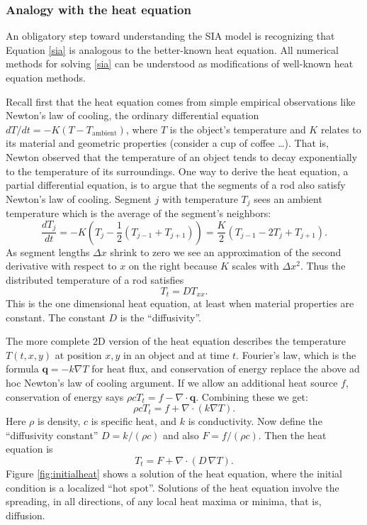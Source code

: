 \documentclass[titlepage,letterpaper,final,12pt]{scrartcl}
\newcommand{\grad}{\nabla}
\newcommand{\Div}{\nabla\cdot}
\begin{document}
\subsubsection*{Analogy with the heat equation}  An obligatory step toward understanding the SIA model is recognizing that Equation \eqref{sia} is analogous to the better-known heat equation.  All numerical methods for solving \eqref{sia} can be understood as modifications of well-known heat equation methods.

Recall first that the heat equation comes from simple empirical observations like Newton's law of cooling, the ordinary differential equation $dT/dt = -K (T-T_{\text{ambient}})$, 
where $T$ is the object's temperature and $K$ relates to its material and geometric properties (consider a cup of coffee \dots).  That is, Newton observed that the temperature of an object tends to decay exponentially to the temperature of its surroundings.  One way to derive the heat equation, a partial differential equation, is to argue that the segments of a rod also satisfy Newton's law of cooling.  Segment $j$ with temperature $T_j$ sees an ambient temperature which is the average of the segment's neighbors:
   $$\frac{dT_j}{dt} = -K \left(T_j - \frac{1}{2} (T_{j-1} + T_{j+1}) \right) = \frac{K}{2} \left(T_{j-1} - 2 T_j + T_{j+1}\right).$$
As segment lengths $\Delta x$ shrink to zero we see an approximation of the second derivative with respect to $x$ on the right because $K$ scales with $\Delta x^2$.  Thus the distributed temperature of a rod satisfies
\begin{equation}
  T_t = D T_{xx}. \label{heat1D}
\end{equation}
This is the one dimensional heat equation, at least when material properties are constant.  The constant $D$ is the ``diffusivity''.

The more complete 2D version of the heat equation describes the temperature $T(t,x,y)$ at position $x,y$ in an object and at time $t$.  Fourier's law, which is the formula $\mathbf{q} = - k \grad T$ for heat flux, and conservation of energy replace the above ad hoc Newton's law of cooling argument.  If we allow an additional heat source $f$, conservation of energy says $\rho c T_t = f - \Div \mathbf{q}$.  Combining these we get:
	$$\rho c T_t = f + \Div (k \grad T).$$
Here $\rho$ is density, $c$ is specific heat, and $k$ is conductivity.  Now define the ``diffusivity constant'' $D=k/(\rho c)$ and also $F = f/(\rho c)$.  Then the heat equation is
\begin{equation}
T_t = F + \Div (D\, \grad T). \label{heat}
\end{equation}
Figure \ref{fig:initialheat} shows a solution of the heat equation, where the initial condition is a localized ``hot spot''.  Solutions of the heat equation involve the spreading, in all directions, of any local heat maxima or minima, that is, diffusion.
\end{document}
